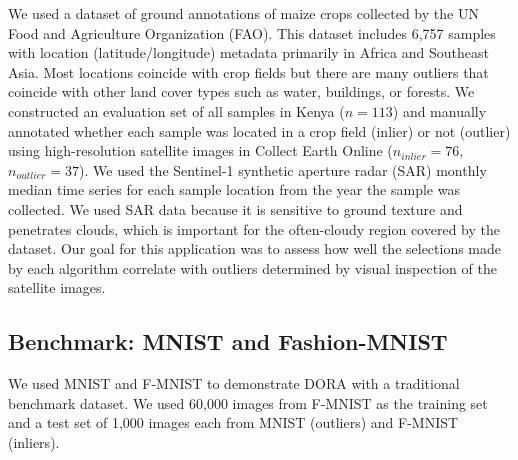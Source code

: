 \documentclass[utf8]{frontiersFPHY} %
\newcommand{\todo}[1]{\textcolor{blue}{#1}}
\begin{document}
We used a dataset of ground annotations of maize crops collected by the UN Food
and Agriculture Organization (FAO). This dataset includes 6,757 samples
with location (latitude/longitude) metadata primarily in Africa and Southeast
Asia. Most locations coincide with crop
fields but there are many outliers that coincide with other land cover types 
such as water, buildings, or forests. We constructed an evaluation set 
of all samples in Kenya ($n=113$) and manually annotated whether 
each sample was located in a crop field (inlier) or not (outlier)
using high-resolution satellite images in Collect Earth 
Online ($n_{inlier}=76$, $n_{outlier}=37$). We used the Sentinel-1 
synthetic aperture radar (SAR) monthly median
time series for each sample location from the year the sample was 
collected. We used SAR data because it is sensitive to ground texture and
penetrates clouds, which is important for the often-cloudy region covered
by the dataset. Our goal for this application was to assess how well the 
selections made by each algorithm correlate with outliers determined by
visual inspection of the satellite images.


\subsection{Benchmark: MNIST and Fashion-MNIST}
We used MNIST and F-MNIST to demonstrate DORA with a
traditional benchmark dataset. We used 60,000 images from 
F-MNIST as the training set and a test set of 1,000 images 
each from MNIST (outliers) and F-MNIST (inliers). 
\end{document}

